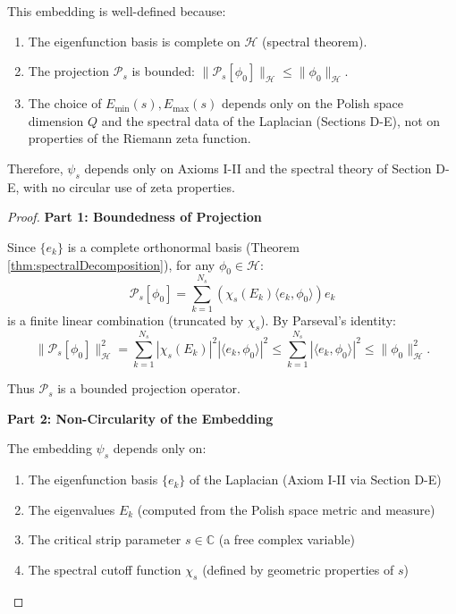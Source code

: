\begin{theorem}
\begin{lemma}
This embedding is well-defined because:
\begin{enumerate}
\item The eigenfunction basis is complete on $\mathcal{H}$ (spectral theorem).
\item The projection $\mathcal{P}_s$ is bounded: $\|\mathcal{P}_s[\phi_0]\|_{\mathcal{H}} \leq \|\phi_0\|_{\mathcal{H}}$.
\item The choice of $E_{\min}(s), E_{\max}(s)$ depends only on the Polish space dimension $Q$ and the spectral data of the Laplacian (Sections D-E), not on properties of the Riemann zeta function.
\end{enumerate}

Therefore, $\psi_s$ depends only on Axioms I-II and the spectral theory of Section D-E, with no circular use of zeta properties.

\begin{proof}

\textbf{Part 1: Boundedness of Projection}

Since $\{e_k\}$ is a complete orthonormal basis (Theorem \ref{thm:spectralDecomposition}), for any $\phi_0 \in \mathcal{H}$:
\begin{equation}
\mathcal{P}_s[\phi_0] = \sum_{k=1}^{N_s} (\chi_s(E_k) \langle e_k, \phi_0 \rangle) e_k
\end{equation}
is a finite linear combination (truncated by $\chi_s$). By Parseval's identity:
\begin{equation}
\|\mathcal{P}_s[\phi_0]\|_{\mathcal{H}}^2 = \sum_{k=1}^{N_s} |\chi_s(E_k)|^2 |\langle e_k, \phi_0 \rangle|^2 \leq \sum_{k=1}^{N_s} |\langle e_k, \phi_0 \rangle|^2 \leq \|\phi_0\|_{\mathcal{H}}^2.
\end{equation}

Thus $\mathcal{P}_s$ is a bounded projection operator.

\textbf{Part 2: Non-Circularity of the Embedding}

The embedding $\psi_s$ depends only on:
\begin{enumerate}
\item The eigenfunction basis $\{e_k\}$ of the Laplacian (Axiom I-II via Section D-E)
\item The eigenvalues $E_k$ (computed from the Polish space metric and measure)
\item The critical strip parameter $s \in \mathbb{C}$ (a free complex variable)
\item The spectral cutoff function $\chi_s$ (defined by geometric properties of $s$)
\end{enumerate}


\end{proof}
\end{lemma}
\end{theorem}
